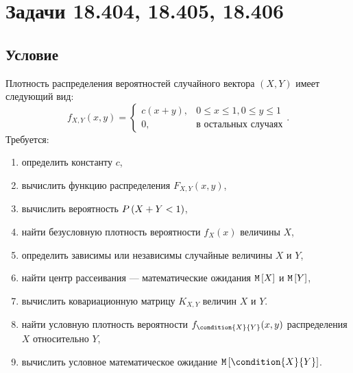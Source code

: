 \documentclass[12pt,a4paper]{article}
\begin{document}
    \section{Задачи 18.404, 18.405, 18.406}
    \subsection*{Условие}
    Плотность распределения вероятностей случайного вектора $\left ( X, Y \right )$ имеет следующий вид:
    $$
    f_{X,Y}(x,y)
    = \left \{
    \begin{array}{ll}
        c ( x + y ), & 0 \le x \le 1, 0 \le y \le 1 \\
        0,           & \text{в остальных случаях}
    \end{array}
    \right .
    .
    $$
    Требуется:
    \begin{enumerate}
        \item определить константу $c$,
        \item вычислить функцию распределения $F_{X,Y}(x,y)$,
        \item вычислить вероятность $P \left ( X + Y < 1 \right )$,
        \item найти безусловную плотность вероятности $f_X(x)$ величины $X$,
        \item определить зависимы или независимы случайные величины $X$ и $Y$,
        \item найти центр рассеивания --- математические ожидания $\mathtt{M} \left [ X \right ]$ и $\mathtt{M} \left [ Y \right ]$,
        \item вычислить ковариационную матрицу $K_{X,Y}$ величин $X$ и $Y$.
        \item найти условную плотность вероятности $f_{\condition{X}{Y}}(x,y)$ распределения $X$ относительно $Y$,
        \item вычислить условное математическое ожидание $\expectation{\condition{X}{Y}}$.
    \end{enumerate}
\end{document}
